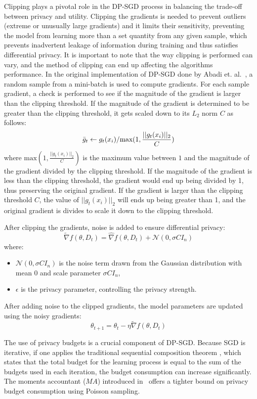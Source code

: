 \documentclass[11pt]{article}
\begin{document}
Clipping plays a pivotal role in the DP-SGD process in balancing the trade-off between privacy and utility. Clipping the gradients is needed to prevent outliers (extreme or unusually large gradients) and it limits their sensitivity, preventing the model from learning more than a set quantity from any given sample, which prevents inadvertent leakage of information during training and thus satisfies differential privacy. It is important to note that the way clipping is performed can vary, and the method of clipping can end up affecting the algorithms performance. In the original implementation of DP-SGD done by Abadi et. al.~\cite{RefWorks:RefID:40-abadi2016deep}, a random sample from a mini-batch is used to compute gradients. For each sample gradient, a check is performed to see if the magnitude of the gradient is larger than the clipping threshold. If the magnitude of the gradient is determined to be greater than the clipping threshold, it gets scaled down to its $L_2$ norm $C$ as follows:
\[ \Bar{g}_t \leftarrow g_t(x_i)/\text{max}(1,\frac{||g_t(x_i)||_2}{C})\]
where $\text{max}(1,\frac{||g_t(x_i)||_2}{C})$ is the maximum value between $1$ and the magnitude of the gradient divided by the clipping threshold. If the magnitude of the gradient is less than the clipping threshold, the gradient would end up being divided by 1, thus preserving the original gradient. If the gradient is larger than the clipping threshold $C$, the value of $||g_t(x_i)||_2$ will ends up being greater than 1, and the original gradient is divides to scale it down to the clipping threshold.

After clipping the gradients, noise is added to ensure differential privacy:
\[ \tilde{\nabla} f(\theta, D_t) = \hat{\nabla} f(\theta, D_t) + \mathcal{N}(0, \sigma C I_n) \]
where:
\begin{itemize}
\item \( \mathcal{N}(0, \sigma C I_n) \) is the noise term drawn from the Gaussian distribution with mean \( 0 \) and scale parameter \( \sigma C I_n \),
\item \( \epsilon \) is the privacy parameter, controlling the privacy strength.
\end{itemize}

After adding noise to the clipped gradients, the model parameters are updated using the noisy gradients:
\[ \theta_{t+1} = \theta_{t} - \eta \tilde{\nabla} f(\theta, D_t) \]

The use of privacy budgets is a crucial component of DP-SGD. Because SGD is iterative, if one applies the traditional sequential composition theorem \cite{gong2020survey}, which states that the total budget for the learning process is equal to the sum of the budgets used in each iteration, the budget consumption can increase significantly. The moments accountant ($MA$)  introduced in~\cite{RefWorks:RefID:40-abadi2016deep} offers a tighter bound on privacy budget consumption using Poisson sampling.
\end{document}
